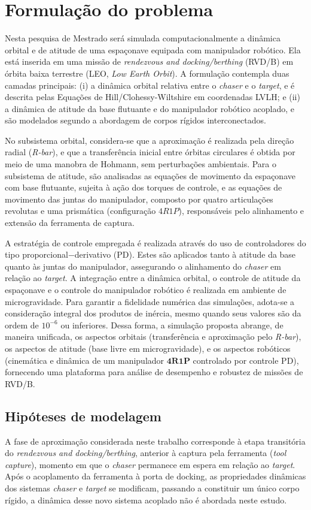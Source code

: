 \chapter{Formulação do problema}

Nesta pesquisa de Mestrado será simulada computacionalmente a dinâmica orbital e de atitude de uma espaçonave equipada com manipulador robótico.
Ela está inserida em uma missão de \emph{rendezvous and docking/berthing} (RVD/B) em órbita baixa terrestre (LEO, \emph{Low Earth Orbit}).
A formulação contempla duas camadas principais:
(i) a dinâmica orbital relativa entre o \emph{chaser} e o \emph{target}, e é descrita pelas Equações de Hill/Clohessy-Wiltshire em coordenadas LVLH; e
(ii) a dinâmica de atitude da base flutuante e do manipulador robótico acoplado, e são modelados segundo a abordagem de corpos rígidos interconectados.

No subsistema orbital, considera-se que a aproximação é realizada pela direção radial (\emph{R-bar}), e que a transferência inicial entre órbitas circulares é obtida por meio de uma manobra de Hohmann, sem perturbações ambientais.
Para o subsistema de atitude, são analisadas as equações de movimento da espaçonave com base flutuante, sujeita à ação dos torques de controle, e as equações de movimento das juntas do manipulador, composto por quatro articulações revolutas e uma prismática (configuração $4R1P$), responsáveis pelo alinhamento e extensão da ferramenta de captura.

A estratégia de controle empregada é realizada através do uso de controladores do tipo proporcional$-$derivativo (PD).
Estes são aplicados tanto à atitude da base quanto às juntas do manipulador, assegurando o alinhamento do \emph{chaser} em relação ao \emph{target}.
A integração entre a dinâmica orbital, o controle de atitude da espaçonave e o controle do manipulador robótico é realizada em ambiente de microgravidade.
Para garantir a fidelidade numérica das simulações, adota-se a consideração integral dos produtos de inércia, mesmo quando seus valores são da ordem de $10^{-6}$ ou inferiores.
Dessa forma, a simulação proposta abrange, de maneira unificada, os aspectos orbitais (transferência e aproximação pelo \emph{R-bar}), os aspectos de atitude (base livre em microgravidade), e os aspectos robóticos (cinemática e dinâmica de um manipulador $\mathbf{4R1P}$ controlado por controle PD), fornecendo uma plataforma para análise de desempenho e robustez de missões de RVD/B.

\section{Hipóteses de modelagem}
A fase de aproximação considerada neste trabalho corresponde à etapa transitória do \emph{rendezvous and docking/berthing}, anterior à captura pela ferramenta (\emph{tool capture}), momento em que o \emph{chaser} permanece em espera em relação ao \emph{target}.
Após o acoplamento da ferramenta à porta de docking, as propriedades dinâmicas dos sistemas \emph{chaser} e \emph{target} se modificam, passando a constituir um único corpo rígido, a dinâmica desse novo sistema acoplado não é abordada neste estudo.

